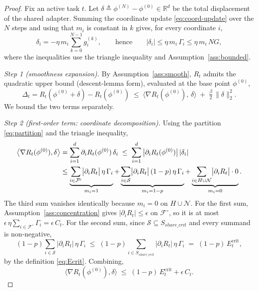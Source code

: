 \documentclass[conference]{IEEEtran}
\theoremstyle{plain}
\theoremstyle{definition}
\theoremstyle{remark}
\begin{document}
\begin{proof}
Fix an active task $t$. Let
$\delta\triangleq\phi^{(N)}-\phi^{(0)}\in\mathbb{R}^{d}$ be the total
displacement of the shared adapter. Summing the coordinate update
\eqref{eq:coord-update} over the $N$ steps and using that $m_{i}$ is
constant in $k$ gives, for every coordinate $i$,
\begin{equation}
\label{eq:disp}
\delta_{i}=-\eta\,m_{i}\sum_{k=0}^{N-1}g^{(k)}_{i},
\qquad\text{hence}\qquad
|\delta_{i}|\le \eta\,m_{i}\,\Gamma_{i}\le \eta\,m_{i}\,NG ,
\end{equation}
where the inequalities use the triangle inequality and
Assumption~\ref{ass:bounded}.

\emph{Step 1 (smoothness expansion).}
By Assumption~\ref{ass:smooth}, $R_{t}$ admits the quadratic upper
bound (descent-lemma form), evaluated at the base point
$\phi^{(0)}$,
\begin{equation}
\label{eq:taylor}
\Delta_{t}=R_{t}(\phi^{(0)}+\delta)-R_{t}(\phi^{(0)})
\;\le\;
\big\langle\nabla R_{t}(\phi^{(0)}),\,\delta\big\rangle
\;+\;\tfrac{\beta}{2}\,\|\delta\|_{2}^{2}.
\end{equation}
We bound the two terms separately.

\emph{Step 2 (first-order term: coordinate decomposition).}
Using the partition \eqref{eq:partition} and the triangle inequality,
\begin{align}
\big\langle\nabla R_{t}(\phi^{(0)}),\delta\big\rangle
&=\sum_{i=1}^{d}\partial_{i}R_{t}(\phi^{(0)})\,\delta_{i}
 \;\le\;\sum_{i=1}^{d}\big|\partial_{i}R_{t}(\phi^{(0)})\big|\,|\delta_{i}|
 \notag\\
&\le
\underbrace{\sum_{i\in\mathcal{F}^{\!\circ}}\!\big|\partial_{i}R_{t}\big|\,\eta\,\Gamma_{i}}_{m_i=1}
+\underbrace{\sum_{i\in\mathcal{S}}\!\big|\partial_{i}R_{t}\big|\,(1-p)\,\eta\,\Gamma_{i}}_{m_i=1-p}
+\underbrace{\sum_{i\in H\cup\mathcal{N}}\!\big|\partial_{i}R_{t}\big|\cdot 0}_{m_i=0}.
\label{eq:three-sums}
\end{align}
The third sum vanishes identically because $m_{i}=0$ on $H\cup\mathcal{N}$.
For the first sum, Assumption~\ref{ass:concentration} gives
$|\partial_{i}R_{t}|\le\epsilon$ on $\mathcal{F}^{\!\circ}$, so it is
at most $\epsilon\,\eta\sum_{i\in\mathcal{F}^{\!\circ}}\Gamma_{i}=\epsilon\,C_{t}$.
For the second sum, since $\mathcal{S}\subseteq S_{share\_crit}$ and
every summand is non-negative,
\begin{equation}
(1-p)\!\sum_{i\in\mathcal{S}}\!\big|\partial_{i}R_{t}\big|\,\eta\,\Gamma_{i}
\;\le\;
(1-p)\!\!\sum_{i\in S_{share\_crit}}\!\!\big|\partial_{i}R_{t}\big|\,\eta\,\Gamma_{i}
\;=\;(1-p)\,E^{\mathrm{crit}}_{t},
\end{equation}
by the definition \eqref{eq:Ecrit}. Combining,
\begin{equation}
\label{eq:first-order-bound}
\big\langle\nabla R_{t}(\phi^{(0)}),\delta\big\rangle
\;\le\;(1-p)\,E^{\mathrm{crit}}_{t}+\epsilon\,C_{t}.
\end{equation}


\end{proof}
\end{document}
